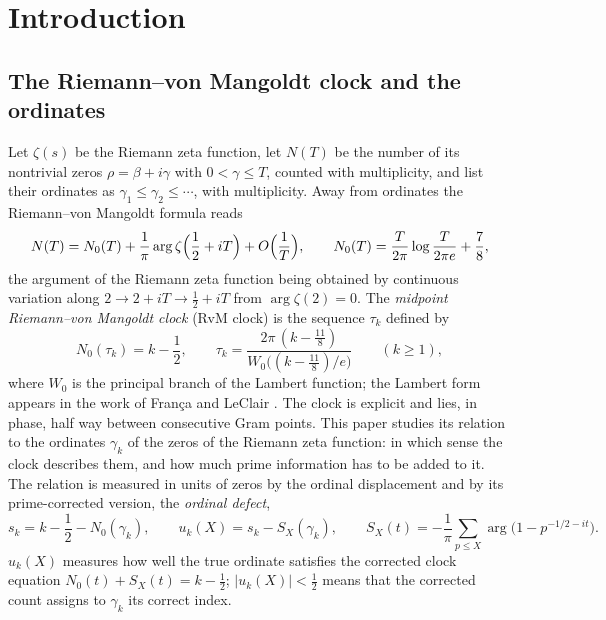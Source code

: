 \documentclass[preprint,12pt]{elsarticle}
\numberwithin{equation}{section}
\theoremstyle{plain}
\theoremstyle{definition}
\theoremstyle{remark}
\newcommand{\NO}{N_0}
\begin{document}
\tableofcontents

\section{Introduction}
\label{sec:introduction}

\subsection{The Riemann--von Mangoldt clock and the ordinates}
\label{subsec:clock_intro}
Let $\zeta(s)$ be the Riemann zeta function, let $N(T)$ be the number of its nontrivial zeros $\rho=\beta+i\gamma$ with $0<\gamma\le T$, counted with multiplicity, and list their ordinates as $\gamma_1\le\gamma_2\le\cdots$, with multiplicity. Away from ordinates the Riemann--von Mangoldt formula reads \cite[\S\S9.3--9.4]{Titchmarsh1986}
\begin{equation}
 N(T)=\NO(T)+\frac1\pi\arg\zeta\Bigl(\frac12+iT\Bigr)+O\Bigl(\frac1T\Bigr),\qquad \NO(T)=\frac{T}{2\pi}\log\frac{T}{2\pi e}+\frac78,
 \label{eq:intro_rvm}
\end{equation}
the argument of the Riemann zeta function being obtained by continuous variation along $2\to2+iT\to\frac12+iT$ from $\arg\zeta(2)=0$. The \emph{midpoint Riemann--von Mangoldt clock} (RvM clock) is the sequence $\tau_k$ defined by
\begin{equation}
 \NO(\tau_k)=k-\frac12,\qquad \tau_k=\frac{2\pi\,(k-\frac{11}8)}{W_0\bigl((k-\frac{11}8)/e\bigr)}\qquad(k\ge1),
 \label{eq:intro_clock}
\end{equation}
where $W_0$ is the principal branch of the Lambert function; the Lambert form appears in the work of Fran\c{c}a and LeClair \cite{FrancaLeClair2014,FrancaLeClair2015}. The clock is explicit and lies, in phase, half way between consecutive Gram points. This paper studies its relation to the ordinates $\gamma_k$ of the zeros of the Riemann zeta function: in which sense the clock describes them, and how much prime information has to be added to it. The relation is measured in units of zeros by the ordinal displacement and by its prime-corrected version, the \emph{ordinal defect},
\begin{equation}
 s_k=k-\frac12-\NO(\gamma_k),\qquad u_k(X)=s_k-S_X(\gamma_k),\qquad S_X(t)=-\frac1\pi\sum_{p\le X}\arg\bigl(1-p^{-1/2-it}\bigr).
 \label{eq:intro_defect}
\end{equation}
$u_k(X)$ measures how well the true ordinate satisfies the corrected clock equation $\NO(t)+S_X(t)=k-\frac12$; $|u_k(X)|<\frac12$ means that the corrected count assigns to $\gamma_k$ its correct index.
\end{document}
